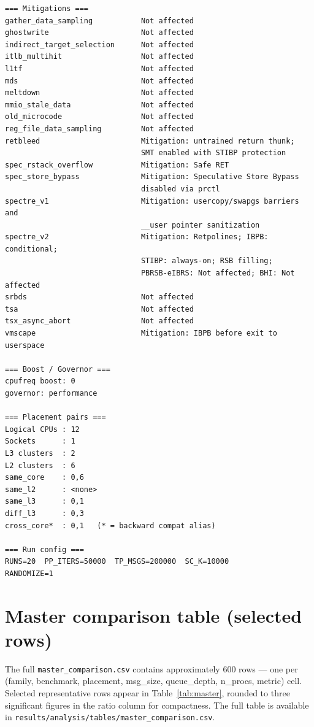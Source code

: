 \documentclass[a4paper,11pt]{article}
\begin{document}
\begin{footnotesize}
\begin{verbatim}
=== Mitigations ===
gather_data_sampling           Not affected
ghostwrite                     Not affected
indirect_target_selection      Not affected
itlb_multihit                  Not affected
l1tf                           Not affected
mds                            Not affected
meltdown                       Not affected
mmio_stale_data                Not affected
old_microcode                  Not affected
reg_file_data_sampling         Not affected
retbleed                       Mitigation: untrained return thunk;
                               SMT enabled with STIBP protection
spec_rstack_overflow           Mitigation: Safe RET
spec_store_bypass              Mitigation: Speculative Store Bypass
                               disabled via prctl
spectre_v1                     Mitigation: usercopy/swapgs barriers and
                               __user pointer sanitization
spectre_v2                     Mitigation: Retpolines; IBPB: conditional;
                               STIBP: always-on; RSB filling;
                               PBRSB-eIBRS: Not affected; BHI: Not affected
srbds                          Not affected
tsa                            Not affected
tsx_async_abort                Not affected
vmscape                        Mitigation: IBPB before exit to userspace

=== Boost / Governor ===
cpufreq boost: 0
governor: performance

=== Placement pairs ===
Logical CPUs : 12
Sockets      : 1
L3 clusters  : 2
L2 clusters  : 6
same_core    : 0,6
same_l2      : <none>
same_l3      : 0,1
diff_l3      : 0,3
cross_core*  : 0,1   (* = backward compat alias)

=== Run config ===
RUNS=20  PP_ITERS=50000  TP_MSGS=200000  SC_K=10000
RANDOMIZE=1
\end{verbatim}
\end{footnotesize}

\section{Master comparison table (selected rows)}
\label{app:master}

The full \texttt{master\_comparison.csv} contains approximately 600
rows --- one per (family, benchmark, placement, msg\_size,
queue\_depth, n\_procs, metric) cell. Selected representative rows
appear in Table~\ref{tab:master}, rounded to three significant figures
in the ratio column for compactness. The full table is available in
\texttt{results/analysis/tables/master\_comparison.csv}.
\end{document}
